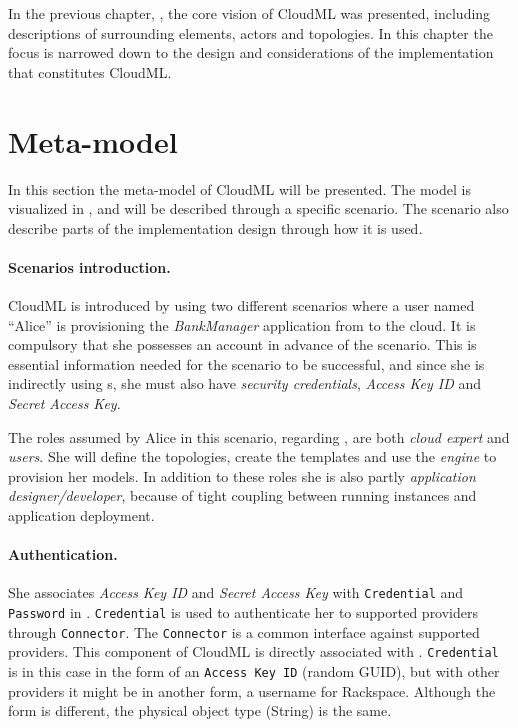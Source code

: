 
In the previous chapter, , the core vision of CloudML was presented,
including descriptions of surrounding elements, \eg actors and topologies.
In this chapter the focus is narrowed down to the design and considerations 
of the implementation that constitutes CloudML.

\section{Meta-model}


In this section the meta-model of CloudML will be presented.
The model is visualized in , and will be described through a specific scenario.
The scenario also describe parts of the implementation design through how it is used.

\paragraph{Scenarios introduction.}

CloudML is introduced by using two different scenarios where a user named ``Alice'' is provisioning the 
\emph{BankManager} application from  to the  cloud.
It is compulsory that she possesses an  account in advance of the scenario.
This is essential information needed for the scenario to be successful,
and since she is indirectly using  s,
she must also have \emph{security credentials},
\ie \emph{Access Key ID} and \emph{Secret Access Key}.

The roles assumed by Alice in this scenario, regarding ,
are both \emph{cloud expert} and \emph{users}.
She will define the topologies, create the templates and use 
the \emph{engine} to provision her models.
In addition to these roles she is also partly \emph{application designer/developer},
because of tight coupling between running instances and application deployment.

\paragraph{Authentication.}

She associates \emph{Access Key ID} and \emph{Secret Access Key} with 
\texttt{Credential} and \texttt{Password} in .
\texttt{Credential} is used to authenticate her to supported providers through \texttt{Connector}.
The \texttt{Connector} is a common interface against supported providers.
This component of CloudML is directly associated with .
\texttt{Credential} is in this case in the form of an \texttt{Access Key ID} (random GUID),
but with other providers it might be in another form, \eg a username for Rackspace.
Although the form is different, the physical object type (String) is the same.

